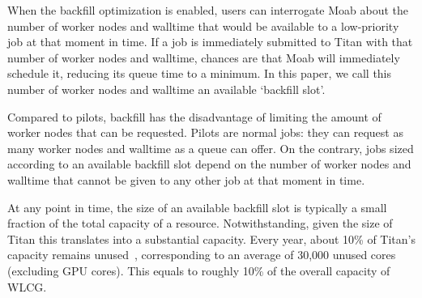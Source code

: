 When the backfill optimization is enabled, users can interrogate Moab about
the number of worker nodes and walltime that would be available to a
low-priority job at that moment in time. If a job is immediately submitted to
Titan with that number of worker nodes and walltime, chances are that Moab
will immediately schedule it, reducing its queue time to a minimum. In this
paper, we call this number of worker nodes and walltime an available
`backfill slot'.

Compared to pilots, backfill has the disadvantage of limiting the amount of
worker nodes that can be requested. Pilots are normal jobs: they can request
as many worker nodes and walltime as a queue can offer. On the contrary, jobs
sized according to an available backfill slot depend on the number of worker
nodes and walltime that cannot be given to any other job at that moment in
time.

At any point in time, the size of an available backfill slot is typically a
small fraction of the total capacity of a resource. Notwithstanding, given
the size of Titan this translates into a substantial capacity. Every year,
about 10\% of Titan's capacity remains unused~\cite{barker2016us},
corresponding to an average of 30,000 unused cores (excluding GPU cores).
This equals to roughly 10\% of the overall capacity of WLCG\@.


